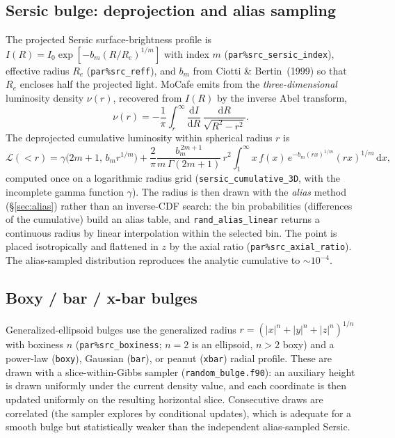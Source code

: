 \documentclass[english,a4paper]{kiseon_memo}
\newcommand{\dd}{\mathrm{d}}
\newcommand{\code}[1]{\texttt{#1}}
\newcommand{\file}[1]{\texttt{#1}}
\newcommand{\pp}[1]{\texttt{par\%#1}}
\begin{document}
\subsection{Sersic bulge: deprojection and alias sampling}\label{sec:sersic}
The projected Sersic surface-brightness profile is
$I(R)=I_0\exp[-b_m(R/R_e)^{1/m}]$ with index $m$ (\pp{src\_sersic\_index}),
effective radius $R_e$ (\pp{src\_reff}), and $b_m$ from Ciotti \& Bertin~(1999)
so that $R_e$ encloses half the projected light.  MoCafe emits from the
\emph{three-dimensional} luminosity density $\nu(r)$, recovered from $I(R)$ by the
inverse Abel transform,
\begin{equation}
  \nu(r) = -\frac{1}{\pi}\int_r^\infty \frac{\dd I}{\dd R}\,
             \frac{\dd R}{\sqrt{R^2-r^2}} .
\end{equation}
The deprojected cumulative luminosity within spherical radius $r$ is
\begin{equation}
  \mathcal L(<r) = \gamma\!\big(2m{+}1,\,b_m r^{1/m}\big)
     + \frac{2}{\pi}\frac{b_m^{\,2m+1}}{m\,\Gamma(2m{+}1)}\,r^2
       \!\int_1^\infty\!\! x\,f(x)\,e^{-b_m(rx)^{1/m}}(rx)^{1/m}\,\dd x,
\end{equation}
computed once on a logarithmic radius grid (\code{sersic\_cumulative\_3D}, with
the incomplete gamma function $\gamma$).  The radius is then drawn with the
\emph{alias} method (\S\ref{sec:alias}) rather than an inverse-CDF search: the
bin probabilities (differences of the cumulative) build an alias table, and
\code{rand\_alias\_linear} returns a continuous radius by linear interpolation
within the selected bin.  The point is placed isotropically and flattened in $z$
by the axial ratio (\pp{src\_axial\_ratio}).  The alias-sampled distribution
reproduces the analytic cumulative to $\sim10^{-4}$.

\subsection{Boxy / bar / x-bar bulges}
Generalized-ellipsoid bulges use the generalized radius
$r=(|x|^n+|y|^n+|z|^n)^{1/n}$ with boxiness $n$ (\pp{src\_boxiness}; $n=2$ is an
ellipsoid, $n>2$ boxy) and a power-law (\code{boxy}), Gaussian (\code{bar}), or
peanut (\code{xbar}) radial profile.  These are drawn with a slice-within-Gibbs
sampler (\file{random\_bulge.f90}): an auxiliary height is drawn uniformly under
the current density value, and each coordinate is then updated uniformly on the
resulting horizontal slice.  Consecutive draws are correlated (the sampler
explores by conditional updates), which is adequate for a smooth bulge but
statistically weaker than the independent alias-sampled Sersic.
\end{document}
